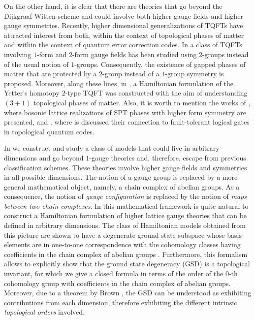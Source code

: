 \documentclass[titlepage,11pt]{article}
\theoremstyle{plain}%
\theoremstyle{definition}
\theoremstyle{remark}
\begin{document}
On the other hand, it is clear that there are theories that go beyond the Dijkgraaf-Witten scheme and could involve both higher gauge fields and higher gauge symmetries. Recently, higher dimensional generalizations of TQFTs have attracted interest from both, within the context of topological phases of matter and within the context of quantum error correction codes.  In \cite{Kapustin13} a class of TQFTs involving $1$-form and $2$-form gauge fields has been studied using $2$-groups instead of the usual notion of  $1$-groups. Consequently, the existence of gapped phases of matter that are protected by a $2$-group instead of a $1$-group symmetry is proposed. Moreover, along these lines, in \cite{Bullivant16}, a Hamiltonian formulation of the Yetter’s homotopy $2$-type TQFT \cite{Yetter} was constructed with the aim of understanding $(3+1)$ topological phases of matter. Also, it is worth to mention the works of \cite{Yoshida16}, where bosonic lattice realizations of SPT phases with higher form symmetry are presented, and \cite{Yoshida15,Yoshida17}, where is discussed their connection to fault-tolerant logical gates in topological quantum codes. 


In \cite{higher} we construct and study a class of models that could live in arbitrary dimensions and go beyond $1$-gauge theories and, therefore, escape from previous classification schemes. These theories involve higher gauge fields and symmetries in all possible dimensions. The notion of a gauge group is replaced by a more general mathematical object, namely, a chain complex of abelian groups. As a consequence, the notion of \textit{gauge configuration} is replaced by the notion of \textit{maps between two chain complexes}. In this mathematical framework is quite natural to construct a Hamiltonian formulation of higher lattice gauge theories that can be defined in arbitrary dimensions. The class of Hamiltonian models obtained from this picture are shown to have a degenerate ground state subspace whose basis elements are in one-to-one correspondence with the cohomology classes having coefficients in the chain complex of abelian groups \cite{Brown}. Furthermore, this formalism allows to explicitly show that the ground state degeneracy (GSD) is a topological invariant, for which we give a closed formula in terms of the order of the $0$-th cohomology group with coefficients in the chain complex of abelian groups. Moreover, due to a theorem by Brown \cite{Brown}, the GSD can be understood as exhibiting contributions from each dimension, therefore exhibiting the different intrinsic \textit{topological orders} involved.  
\end{document}
